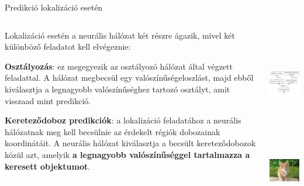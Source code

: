 \documentclass[english, aspectratio=169]{beamer}
\begin{document}
\begin{frame}{Predikció lokalizáció esetén}
\begin{columns}
\begin{column}{.6\textwidth}
Lokalizáció esetén a neurális hálózat két részre ágazik, mivel két különböző feladatot kell elvégeznie:\par\smallskip
\textbf{Osztályozás}: ez megegyezik az osztályozó hálózat által végzett feladattal. A hálózat megbecsül egy valószínűségeloszlást, majd ebből kiválasztja a legnagyobb valószínűséghez tartozó osztályt, amit visszaad mint predikció.\par\smallskip
\textbf{Kereteződoboz predikciók}: a lokalizáció feladatához a neurális hálózatnak meg kell becsülnie az érdekelt régiók dobozainak koordinátáit. A neurális hálózat kiválasztja a becsült kereteződobozok közül azt, amelyik \textbf{a legnagyobb valószínűséggel tartalmazza a keresett objektumot}. 
\end{column}
\begin{column}{.4\textwidth}
\begin{center}
\includegraphics[height=5cm, keepaspectratio]{graphs/od_2.png}\\
\vspace{-0.7cm}
\includegraphics[height=2.5cm, width=2.5cm, keepaspectratio]{images/od_1.png}
\end{center}
\end{column}
\end{columns}
\end{frame}
\end{document}

